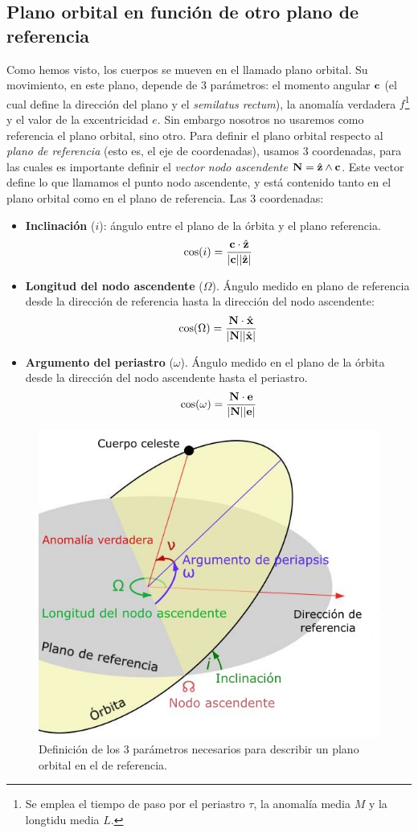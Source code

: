 \subsection{Plano orbital en función de otro plano de referencia}

Como hemos visto, los cuerpos se mueven en el llamado plano orbital. Su movimiento, en este plano, depende de 3 parámetros: el momento angular $\mathbf{c}$ (el cual define la dirección del plano y el \textit{semilatus rectum}), la anomalía verdadera $f$\footnote{Se emplea el tiempo de paso por el periastro $\tau$, la anomalía media $M$ y la longtidu media $L$.} y el valor de la excentricidad $e$.  Sin embargo nosotros no usaremos como referencia el plano orbital, sino otro. Para definir el plano orbital respecto al \textit{plano de referencia} (esto es, el eje de coordenadas), usamos 3 coordenadas, para las cuales es importante definir el \textit{vector nodo ascendente} $\mathbf{N}=\hat{\mathbf{z}}\wedge\mathbf{c}$. Este vector define lo que llamamos el punto nodo ascendente, y está contenido tanto en el plano orbital como en el plano de referencia. Las 3 coordenadas:
\begin{itemize}
	\item \textbf{Inclinación} ($i$): ángulo entre el plano de la órbita y el plano referencia.
	      \begin{equation}
		      \cos (i) = \frac{\mathbf{c} \cdot \hat{\mathbf{z}}}{|\mathbf{c}||\hat{\mathbf{z}}|}
	      \end{equation}
	\item \textbf{Longitud del nodo ascendente} ($\Omega$). Ángulo medido en plano de referencia desde la dirección de referencia hasta la dirección del nodo ascendente:
	      \begin{equation}
		      \cos (\Omega) = \frac{\mathbf{N} \cdot \hat{\mathbf{x}}}{|\mathbf{N}||\hat{\mathbf{x}}|}
	      \end{equation}
	\item \textbf{Argumento del periastro} ($\omega$). Ángulo medido en el plano de la órbita desde la dirección del nodo ascendente hasta el periastro.
	      \begin{equation}
		      \cos (\omega) = \frac{\mathbf{N} \cdot \mathbf{e}}{|\mathbf{N}||\mathbf{e}|}
	      \end{equation}
\end{itemize}
\begin{figure}[h!] \centering
	\includegraphics[width=0.6\linewidth]{Cuerpo/Ch_02/02_Elementos_orbitales.jpg}
	\caption{Definición de los 3 parámetros necesarios para describir un plano orbital en el de referencia.}
\end{figure}

